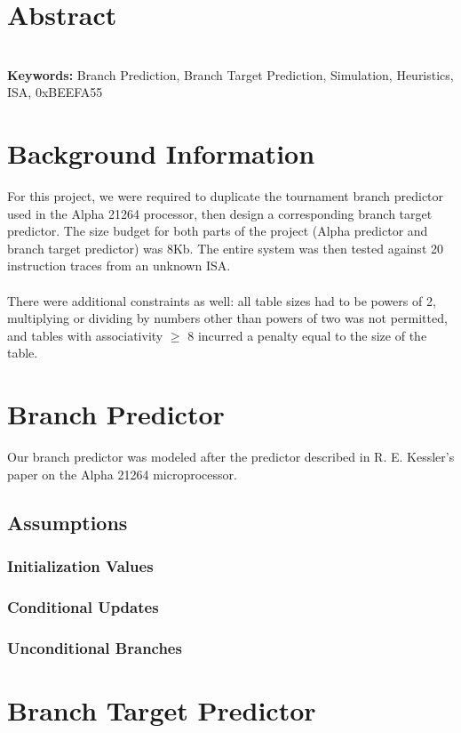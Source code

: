 \documentclass[twocolumn]{article}
\begin{document}
\section{Abstract}
\textit{  }\\

\textbf{Keywords:} Branch Prediction, Branch Target Prediction, Simulation, Heuristics, ISA, 0xBEEFA55

\section{Background Information}
For this project, we were required to duplicate the tournament branch predictor used in the Alpha 21264 processor, then design a corresponding branch target predictor.  The size budget for both parts of the project (Alpha predictor and branch target predictor) was 8Kb.  The entire system was then tested against 20 instruction traces from an unknown ISA. \\\\
There were additional constraints as well: all table sizes had to be powers of 2, multiplying or dividing by numbers other than powers of two was not permitted, and tables with associativity $\ge$ 8 incurred a penalty equal to the size of the table.

\section{Branch Predictor}
Our branch predictor was modeled after the predictor described in R. E. Kessler's paper on the Alpha 21264 microprocessor. 

\subsection{Assumptions}
\subsubsection{Initialization Values}
\subsubsection{Conditional Updates}
\subsubsection{Unconditional Branches}

\section{Branch Target Predictor} 
\end{document}
